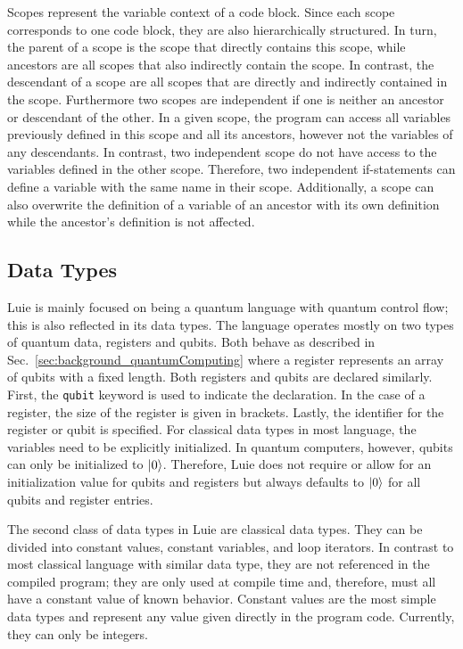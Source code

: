 Scopes represent the variable context of a code block. Since each scope corresponds to one code block, they are also hierarchically structured. In turn, the parent of a scope is the scope that directly contains this scope, while ancestors are all scopes that also indirectly contain the scope.
In contrast, the descendant of a scope are all scopes that are directly and indirectly contained in the scope. Furthermore two scopes are independent if one is neither an ancestor or descendant of the other.  
In a given scope, the program can access all variables previously defined in this scope and all its ancestors, however not the variables of any descendants.  
In contrast, two independent scope do not have access to the variables defined in the other scope. Therefore, two independent if-statements can define a variable with the same name in their scope. Additionally, a scope can also overwrite the definition of a variable of an ancestor with its own definition while the ancestor's definition is not affected.

\subsection{Data Types}
\label{sec:concept_dataTypes}
Luie is mainly focused on being a quantum language with quantum control flow; this is also reflected in its data types. The language operates mostly on two types of quantum data, registers and qubits. Both behave as described in Sec.~\ref{sec:background_quantumComputing} where a register represents an array of qubits with a fixed length.
Both registers and qubits are declared similarly. First, the \texttt{qubit} keyword is used to indicate the declaration. In the case of a register, the size of the register is given in brackets. Lastly, the identifier for the register or qubit is specified. For classical data types in most language, the variables need to be explicitly initialized. In quantum computers, however, qubits can only be initialized to $\ket{0}$. Therefore, Luie does not require or allow for an initialization value for qubits and registers but always defaults to $\ket{0}$ for all qubits and register entries.

The second class of data types in Luie are classical data types. They can be divided into constant values, constant variables, and loop iterators. In contrast to most classical language with similar data type, they are not referenced in the compiled program; they are only used at compile time and, therefore, must all have a constant value of known behavior. 
Constant values are the most simple data types and represent any value given directly in the program code. Currently, they can only be integers. 

